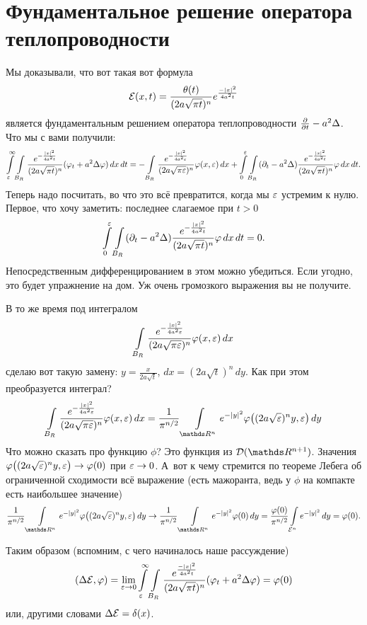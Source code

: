 \section{Фундаментальное решение оператора теплопроводности}
Мы доказывали, что вот такая вот формула
\[
  \mathcal E(x,t) = \frac{\theta(t)}{(2a\sqrt{\pi t})^n}e^{\frac{-|x|^2}{4a^2t}}
\]
является фундаментальным решением оператора теплопроводности $\frac{\partial }{\partial t} - a^2\Delta$. Что мы с вами получили:
\[
  \int\limits_\varepsilon^\infty \int\limits_{B_R}\frac{e^{-\frac{|x|^2}{4a^2t}}}{(2a\sqrt{\pi t})^n}(\varphi_t + a^2\Delta\varphi)\,dx\,dt = 
  - \int\limits_{B_R}\frac{e^{-\frac{|x|^2}{4a^2\varepsilon}}}{(2a\sqrt{\pi \varepsilon})^n}\varphi(x,\varepsilon)\,dx + 
    \int\limits_0^\varepsilon\int\limits_{B_R}(\partial_t-a^2\Delta) \frac{e^{-\frac{|x|^2}{4a^2t}}}{(2a\sqrt{\pi t})^n}\varphi\,dx\,dt.
\]
Теперь надо посчитать, во что это всё превратится, когда мы $\varepsilon$ устремим к нулю. Первое, что хочу заметить: последнее слагаемое при $t>0$
\[
\int\limits_0^\varepsilon\int\limits_{B_R}(\partial_t-a^2\Delta) \frac{e^{-\frac{|x|^2}{4a^2t}}}{(2a\sqrt{\pi t})^n}\varphi\,dx\,dt = 0.
\]
Непосредственным дифференцированием в этом можно убедиться. Если угодно, это будет упражнение на дом. Уж очень громозкого выражения вы не получите.

В то же время под интегралом
\[
  \int\limits_{B_R}\frac{e^{-\frac{|x|^2}{4a^2\varepsilon}}}{(2a\sqrt{\pi \varepsilon})^n}\varphi(x,\varepsilon)\,dx
\]
сделаю вот такую замену: $y = \frac x{2a\sqrt t}$, $dx = (2a\sqrt t)^n\,dy$. Как при этом преобразуется интеграл?
\[
  \Gint{B_R}\frac{e^{-\frac{|x|^2}{4a^2\e}}}{(2a\sqrt{\pi \e})^n}\phi(x,\e)\,dx = 
  \frac 1{\pi^{n/2}}\Gint{\R^n}e^{-|y|^2}\phi\big( (2a\sqrt\e)^ny,\e\big)\,dy
\]
Что можно сказать про функцию $\phi$? Это функция из $\D(\R^{n+1})$. Значения $\varphi\big( (2a\sqrt{\varepsilon})^ny,\varepsilon\big)\rightarrow\varphi(0)$ при $\varepsilon\rightarrow0$. А~вот к чему стремится по теореме Лебега об ограниченной сходимости всё выражение (есть мажоранта, ведь у $\phi$ на компакте есть наибольшее значение)
\[
  \frac 1{\pi^{n/2}}\Gint{\R^n}e^{-|y|^2}\phi\big( (2a\sqrt\e)^ny,\e\big)\,dy \to
  \frac 1{\pi^{n/2}} \Gint{\R^n}e^{-|y|^2}\phi(0)\,dy = \frac{\phi(0)}{\pi^{n/2}}\Gint{\E^n} e^{-|y|^2}\,dy = \phi(0).
\]

Таким образом (вспомним, с чего начиналось наше рассуждение)
\[
  (\Delta\mathcal E,\varphi) = \lim\limits_{\varepsilon\rightarrow0}\int\limits_\varepsilon^\infty\int\limits_{B_R}\frac{e^{\frac{-|x|^2}{4a^2t}}}{(2a\sqrt{\pi t})^n}(\varphi_t+a^2\Delta\varphi) = \varphi(0)
\]
или, другими словами $\Delta\mathcal E = \delta(x)$.

